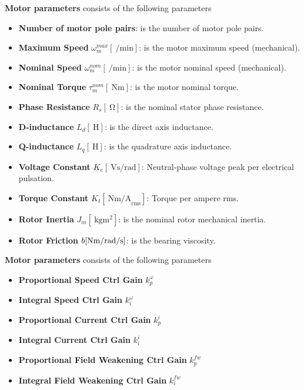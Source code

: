 \documentclass[12pt,a4paper]{scrartcl}
\begin{document}
\begin{onehalfspace}
\textbf{Motor parameters} consists of the following parameters
\begin{itemize}
	\item[--] \textbf{Number of motor pole pairs}: is the number of motor pole pairs.
	\item[--] \textbf{Maximum Speed} $\omega_m^{max}[\SI{}{\per\minute}]$: is the motor maximum speed (mechanical).	\item[--] \textbf{Nominal Speed} $\omega_m^{nom}[\SI{}{\per\minute}]$: is the motor nominal speed (mechanical).
	\item[--] \textbf{Nominal Torque} $\tau_m^{nom}[\SI{}{\newton\meter}]$: is the motor nominal torque.
	\item[--] \textbf{Phase Resistance} $R_{s}[\SI{}{\ohm}]$: is the nominal stator phase resistance.
	\item[--] \textbf{D-inductance} $L_{d}[\SI{}{\henry}]$: is the direct axis inductance.
	\item[--] \textbf{Q-inductance} $L_{q}[\SI{}{\henry}]$: is the quadrature axis inductance.
	\item[--] \textbf{Voltage Constant} $K_e[\SI{ }{\volt\second\per\radian}]$: Neutral-phase voltage peak per electrical pulsation.
	\item[--] \textbf{Torque Constant} $K_t[\SI{ }{\newton\meter\per\ampere}_\text{rms}]$: Torque per ampere rms.
	\item[--] \textbf{Rotor Inertia} $J_m[\SI{}{\kilo\gram\square\meter}]$: is the nominal rotor mechanical inertia.
	\item[--] \textbf{Rotor Friction} $b[\SI{}{\newton\meter\per{\radian\per\second}}]$: is the bearing viscosity.
\end{itemize}

\textbf{Motor parameters} consists of the following parameters
\begin{itemize}
	\item[$-$] \textbf{Proportional Speed Ctrl Gain} $k_p^\omega$
	\item[$-$] \textbf{Integral Speed Ctrl Gain} $k_i^\omega$
	\item[$-$] \textbf{Proportional Current Ctrl Gain} $k_p^i$
	\item[$-$] \textbf{Integral Current Ctrl Gain} $k_i^i$
	\item[$-$] \textbf{Proportional Field Weakening Ctrl Gain} $k_p^{fw}$
	\item[$-$] \textbf{Integral Field Weakening Ctrl Gain} $k_i^{fw}$
\end{itemize}


\end{onehalfspace}
\end{document}

